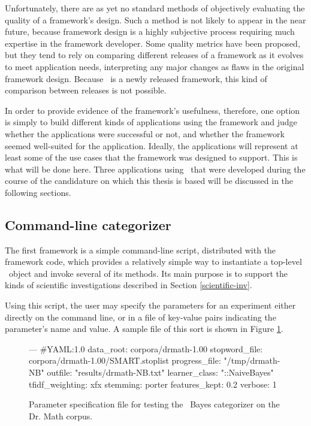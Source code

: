 Unfortunately, there are as yet no standard methods of objectively
evaluating the quality of a framework's design.  Such a method is not
likely to appear in the near future, because framework design is a
highly subjective process requiring much expertise in the framework
developer. \cite[sec. 1.5]{fayad:99} Some quality metrics have been
proposed, but they tend to rely on comparing different releases of a
framework as it evolves to meet application needs, interpreting any
major changes as flaws in the original framework
design. \cite[ch. 25]{fayad:99} Because \aicat\ is a newly released
framework, this kind of comparison between releases is not possible.

In order to provide evidence of the framework's usefulness, therefore,
one option is simply to build different kinds of applications using
the framework and judge whether the applications were successful or
not, and whether the framework seemed well-suited for the application.
Ideally, the applications will represent at least some of the use
cases that the framework was designed to support.  This is what will
be done here.  Three applications using \aicat\ that were developed
during the course of the candidature on which this thesis is based
will be discussed in the following sections.

\subsection{Command-line categorizer}

The first framework is a simple command-line script, distributed with
the framework code, which provides a relatively simple way to
instantiate a top-level \aicat\ object and invoke several of its
methods.  Its main purpose is to support the kinds of scientific
investigations described in Section \ref{scientific-inv}.

Using this script, the user may specify the parameters for an
experiment either directly on the command line, or in a file of
key-value pairs indicating the parameter's name and value.  A sample
file of this sort is shown in Figure \ref{parameter-file}.

\begin{figure}
\begin{code}
--- #YAML:1.0
data_root: corpora/drmath-1.00
stopword_file: corpora/drmath-1.00/SMART.stoplist
progress_file: "/tmp/drmath-NB"
outfile: "results/drmath-NB.txt"
learner_class: "::NaiveBayes"
tfidf_weighting: xfx
stemming: porter
features_kept: 0.2
verbose: 1
\end{code}
\caption{Parameter specification file for testing the \naive\ Bayes
  categorizer on the Dr. Math corpus.}
\label{parameter-file}
\end{figure}

